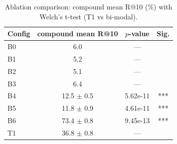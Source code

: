 \begin{table}[htbp]
\centering
\caption{Ablation comparison: compound mean R@10 (\%) with Welch's t-test (T1 vs bi-modal).}
\label{tab:ablation}
\begin{tabular}{lccc}
\toprule
Config & compound mean R@10 & $p$-value & Sig. \\
\midrule
B0 & 6.0 & --- &  \\
B1 & 5.2 & --- &  \\
B2 & 5.1 & --- &  \\
B3 & 6.4 & --- &  \\
B4 & 12.5 $\pm$ 0.5 & 5.62e-11 & *** \\
B5 & 11.8 $\pm$ 0.9 & 4.61e-11 & *** \\
B6 & 73.4 $\pm$ 0.8 & 9.45e-13 & *** \\
T1 & 36.8 $\pm$ 0.8 & --- &  \\
\bottomrule
\end{tabular}
\end{table}
